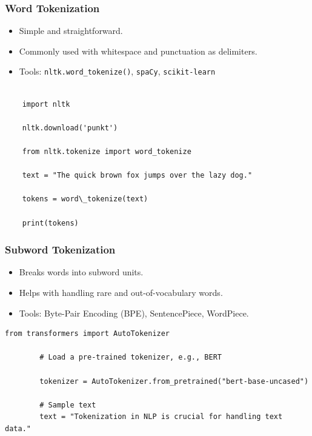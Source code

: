 \documentclass{beamer}
\begin{document}
\begin{frame}[fragile]
    \frametitle{Word Tokenization}
    \begin{itemize}
        \item Simple and straightforward.
        \item Commonly used with whitespace and punctuation as delimiters.
        \item Tools: \texttt{nltk.word\_tokenize()}, \texttt{spaCy}, \texttt{scikit-learn}
    \end{itemize}
    \begin{lstlisting}[style=pythonStyle, caption=nltk.tokenize]

    import nltk

    nltk.download('punkt')

    from nltk.tokenize import word_tokenize

    text = "The quick brown fox jumps over the lazy dog."

    tokens = word\_tokenize(text)

    print(tokens)
    \end{lstlisting}
\end{frame}

\begin{frame}[fragile]
    \frametitle{Subword Tokenization}
    \begin{itemize}
        \item Breaks words into subword units.
        \item Helps with handling rare and out-of-vocabulary words.
        \item Tools: Byte-Pair Encoding (BPE), SentencePiece, WordPiece.
    \end{itemize}
    \begin{lstlisting}[style=pythonStyle, caption=transformers 01]
        from transformers import AutoTokenizer

        # Load a pre-trained tokenizer, e.g., BERT

        tokenizer = AutoTokenizer.from_pretrained("bert-base-uncased")

        # Sample text
        text = "Tokenization in NLP is crucial for handling text data."

    \end{lstlisting}
\end{frame}
\end{document}
